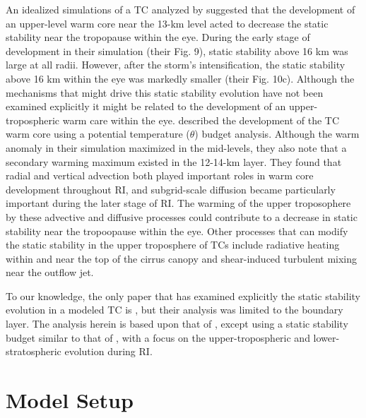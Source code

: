 \documentclass{ametsoc}
\begin{document}
An idealized simulations of a TC analyzed by \cite{OhnoSatoh2015} suggested that the development of an upper-level warm core near the 13-km level acted to decrease the static stability near the tropopause within the eye.
During the early stage of development in their simulation (their Fig. 9), static stability above 16 km was large at all radii.
However, after the storm's intensification, the static stability above 16 km within the eye was markedly smaller (their Fig. 10c).
Although the mechanisms that might drive this static stability evolution have not been examined explicitly it might be related to the development of an upper-tropospheric warm care within the eye.
\cite{SternZhang2013} described the development of the TC warm core using a potential temperature ($\theta$) budget analysis.
Although the warm anomaly in their simulation maximized in the mid-levels, they also note that a secondary warming maximum existed in the 12-14-km layer.
They found that radial and vertical advection both played important roles in warm core development throughout RI, and subgrid-scale diffusion became particularly important during the later stage of RI.
The warming of the upper troposophere by these advective and diffusive processes could contribute to a decrease in static stability near the tropoopause within the eye.
Other processes that can modify the static stability in the upper troposphere of TCs include radiative heating within and near the top of the cirrus canopy and shear-induced turbulent mixing near the outflow jet.

To our knowledge, the only paper that has examined explicitly the static stability evolution in a modeled TC is \cite{Kepertetal2016}, but their analysis was limited to the boundary layer.
The analysis herein is based upon that of \cite{SternZhang2013}, except using a static stability budget similar to that of \cite{Kepertetal2016}, with a focus on the upper-tropospheric and lower-stratospheric evolution during RI.

 \section{Model Setup}
\end{document}
